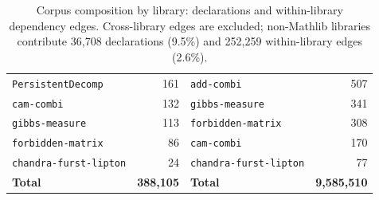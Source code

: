 \begin{table}[H]
\begin{tabular}{lrlr}
\texttt{PersistentDecomp} & 161 & \texttt{add-combi} & 507 \\
\texttt{cam-combi} & 132 & \texttt{gibbs-measure} & 341 \\
\texttt{gibbs-measure} & 113 & \texttt{forbidden-matrix} & 308 \\
\texttt{forbidden-matrix} & 86 & \texttt{cam-combi} & 170 \\
\texttt{chandra-furst-lipton} & 24 & \texttt{chandra-furst-lipton} & 77 \\
\midrule
\textbf{Total} & \textbf{388{,}105} & \textbf{Total} & \textbf{9{,}585{,}510} \\
\bottomrule
\end{tabular}
\caption{Corpus composition by library: declarations and within-library dependency edges. Cross-library edges are excluded; non-Mathlib libraries contribute 36{,}708 declarations (9.5\%) and 252{,}259 within-library edges (2.6\%).}
\label{tab:corpus}
\end{table}
